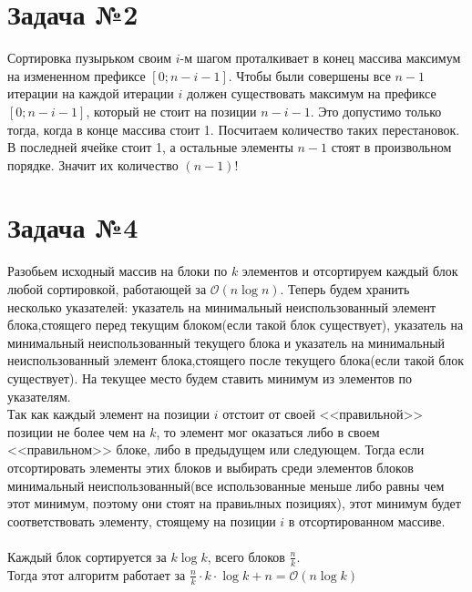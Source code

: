 \documentclass{article}
\begin{document}
\section*{Задача №2}
Сортировка пузырьком своим $i$-м шагом проталкивает в конец массива максимум на измененном префиксе $[0;n - i - 1]$. Чтобы были совершены все $n - 1$ итерации на каждой итерации $i$ должен существовать максимум на префиксе $[0; n - i - 1]$, который не стоит на позиции $n - i - 1$. Это допустимо только тогда, когда в конце массива стоит 1. 
Посчитаем количество таких перестановок. В последней ячейке стоит 1, а остальные элементы $n - 1$ стоят в произвольном порядке. Значит их количество $(n - 1)!$

\section*{Задача №4}
Разобьем исходный массив на блоки по $k$ элементов и отсортируем каждый блок любой сортировкой, работающей за $\mathcal{O}(n\log{n})$. Теперь будем хранить несколько указателей: указатель на минимальный неиспользованный элемент блока,стоящего перед текущим блоком(если такой блок существует), указатель на минимальный неиспользованный текущего блока и указатель на минимальный неиспользованный элемент блока,стоящего после текущего блока(если такой блок существует). На текущее место будем ставить минимум из элементов по указателям. 
\\
Так как каждый элемент на позиции $i$ отстоит от своей <<правильной>>  позиции не более чем на $k$, то элемент мог оказаться либо в своем <<правильном>> блоке, либо в предыдущем или следующем. Тогда если отсортировать элементы этих блоков и выбирать среди элементов блоков минимальный неиспользованный(все использованные меньше либо равны чем этот минимум, поэтому они стоят на правиьлных позициях), этот минимум будет соответствовать элементу, стоящему на позиции $i$ в отсортированном массиве. 
\\\\
Каждый блок сортируется за $k \log{k}$, всего блоков $\frac{n}{k}$.
\\
Тогда этот алгоритм работает за $\frac{n}{k} \cdot k \cdot \log{k} + n = \mathcal{O}(n\log{k})$
\end{document}
